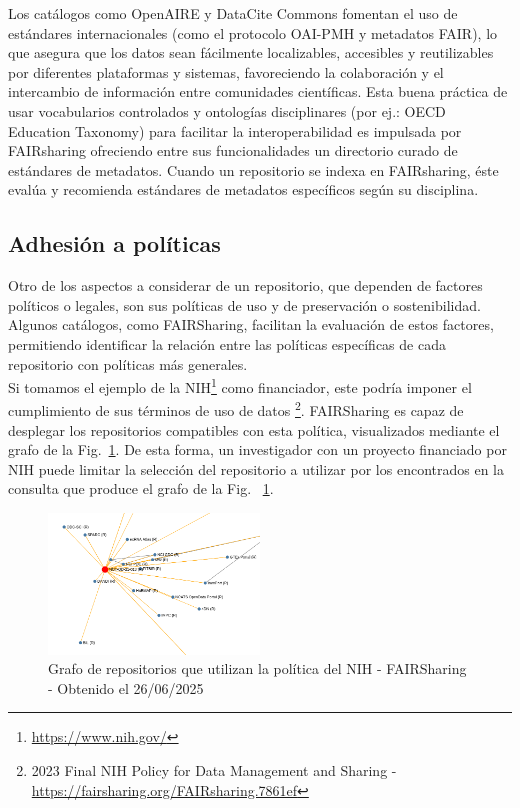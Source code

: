\documentclass[runningheads]{llncs}
\begin{document}
Los catálogos como OpenAIRE y DataCite Commons fomentan el uso de estándares internacionales (como el protocolo OAI-PMH y metadatos FAIR), lo que asegura que los datos sean fácilmente localizables, accesibles y reutilizables por diferentes plataformas y sistemas, favoreciendo la colaboración y el intercambio de información entre comunidades científicas. Esta buena práctica de usar vocabularios controlados
y ontologías disciplinares (por ej.:  OECD Education Taxonomy) para facilitar la interoperabilidad es impulsada por FAIRsharing  ofreciendo entre sus funcionalidades un directorio curado de estándares de metadatos. Cuando un repositorio se indexa  en FAIRsharing, éste evalúa y recomienda estándares de metadatos específicos según su disciplina. \\

\subsection*{Adhesión a políticas}
Otro de los aspectos a considerar de un repositorio, que dependen de factores políticos o legales, son sus políticas de uso y de preservación o sostenibilidad. 
Algunos catálogos, como FAIRSharing, facilitan la evaluación de estos factores, permitiendo identificar la relación entre las políticas específicas de cada repositorio con políticas más generales.\\
Si tomamos el ejemplo de la NIH\footnote{\url{https://www.nih.gov/}} como financiador, este podría imponer el cumplimiento de sus términos de uso de datos \footnote{\label{nih_policy_fairsharing} 2023 Final NIH Policy for Data Management and Sharing - \url{https://fairsharing.org/FAIRsharing.7861ef}}. FAIRSharing es capaz de desplegar los repositorios compatibles con esta política, visualizados mediante el grafo de la Fig.~\ref{fig:fairsharing_nih_policy_repo_usages}. De esta forma, un investigador con un proyecto financiado por NIH puede limitar la selección del repositorio a utilizar por los encontrados en la consulta que produce el grafo de la Fig. ~\ref{fig:fairsharing_nih_policy_repo_usages}.\\


\begin{figure}[h]
    \includegraphics[width=0.5\textwidth]{img/FAIRSharing_NIHPol_Repos.png}
    \caption{
    Grafo de repositorios que utilizan la política del NIH - FAIRSharing - Obtenido el 26/06/2025
    }
    \label{fig:fairsharing_nih_policy_repo_usages}
\end{figure}
\end{document}
